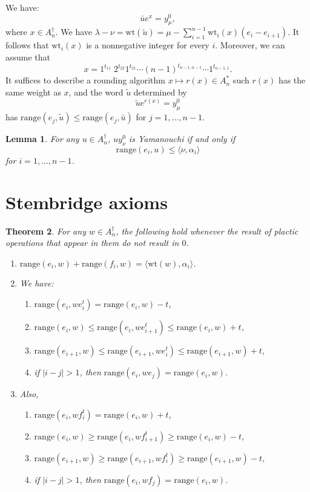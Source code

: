 \documentclass[12pt]{amsproc}
\newcommand{\range}{\mathrm{range}}
\newcommand{\wt}{\mathrm{wt}}
\newtheorem{theorem}{Theorem}
\newtheorem{lemma}[theorem]{Lemma}
\theoremstyle{definition}
\begin{document}
We have:
\begin{displaymath}
  \bar u e^x=y_\mu^0,
\end{displaymath}
where $x\in A_n^\dagger$.
We have $\lambda-\nu=\wt(\tilde u) = \mu-\sum_{i=1}^{n-1}\wt_i(x)(e_i-e_{i+1})$.
It follows that $\wt_i(x)$ is a nonnegative integer for every $i$.
Moreover, we can assume that
\begin{displaymath}
  x = 1^{t_{11}}\;2^{t_{22}}1^{t_{21}}\dotsb (n-1)^{t_{n-1,n-1}}\dotsb 1^{t_{n-1,1}}.
\end{displaymath}
It suffices to describe a rounding algorithm $x\mapsto r(x)\in A_n^*$ such $r(x)$ has the same weight as $x$, and the word $\tilde u$ determined by
\begin{displaymath}
  \tilde u e^{r(x)}=y_\mu^0
\end{displaymath}
has $\range(e_j,\tilde u)\leq \range(e_j,\bar u)$ for $j=1,\dotsc,n-1$.
\begin{lemma}
  For any $u\in A_n^\dagger$, $uy^0_\nu$ is Yamanouchi if and only if
  \begin{displaymath}
    \range(e_i,u)\leq \langle\nu,\alpha_i\rangle
  \end{displaymath}
  for $i=1,\dotsc,n-1$.
\end{lemma}
\section{Stembridge axioms}
\label{sec:stembridge-axioms}
\begin{theorem}
  For any $w\in A_n^\dagger$, the following hold whenever the result of plactic operations that appear in them do not result in $0$.
  \begin{enumerate}
  \item $\range(e_i,w)+\range(f_i,w)=\langle\wt(w),\alpha_i\rangle$.
  \item  We have:
    \begin{enumerate}
    \item $\range(e_i,we_i^t)=\range(e_i,w)-t$,
    \item $\range(e_i,w)\leq \range(e_i,we_{i+1}^t)\leq \range(e_i,w)+t$,
    \item $\range(e_{i+1},w)\leq \range(e_{i+1},we_i^t)\leq \range(e_{i+1},w)+t$,
    \item if $|i-j|>1$, then $\range(e_i,we_j)=\range(e_i,w)$.
    \end{enumerate}
  \item Also,
    \begin{enumerate}
    \item $\range(e_i,wf_i^t)=\range(e_i,w)+t$,
    \item $\range(e_i,w)\geq \range(e_i,wf_{i+1}^t)\geq \range(e_i,w)-t$,
    \item $\range(e_{i+1},w)\geq \range(e_{i+1},wf_i^t)\geq \range(e_{i+1},w)-t$,
    \item if $|i-j|>1$, then $\range(e_i,wf_j)=\range(e_i,w)$.
    \end{enumerate}
  \end{enumerate}
\end{theorem}
\end{document}
